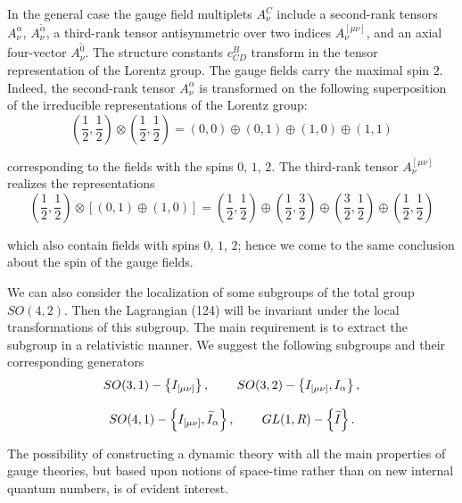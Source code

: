 \documentclass[a4paper,12pt]{article}
\begin{document}
In the general case the gauge field multiplets $A_\nu ^C$ include
a second-rank tensors $A_\nu ^\alpha $, $A_\nu ^{\widetilde{\alpha
}}$, a third-rank tensor antisymmetric over two indices $A_\nu
^{[\mu \nu ]}$, and an axial four-vector $A_\nu ^{\widetilde{0}}$.
The structure constants $ c_{CD}^B$ transform in the tensor
representation of the Lorentz group. The gauge fields carry the
maximal spin $2$. Indeed, the second-rank tensor $ A_\nu ^\alpha $
is transformed on the following superposition of the irreducible
representations of the Lorentz group:
\begin{equation}
\left( \frac 12,\frac 12\right) \otimes \left( \frac 12,\frac
12\right) =\left( 0,0\right) \oplus \left( 0,1\right) \oplus
\left( 1,0\right) \oplus \left( 1,1\right)  \label{130}
\end{equation}

corresponding to the fields with the spins $0$, $1$, $2$. The third-rank
tensor $A_\nu ^{[\mu \nu ]}$ realizes the representations
\begin{equation}
\left( \frac 12,\frac 12\right) \otimes \left[ \left( 0,1\right)
\oplus \left( 1,0\right) \right] =\left( \frac 12,\frac 12\right)
\oplus \left( \frac 12,\frac 32\right) \oplus \left( \frac
32,\frac 12\right) \oplus \left( \frac 12,\frac 12\right)
\label{131}
\end{equation}

which also contain fields with spins $0$, $1$, $2$; hence we come to the
same conclusion about the spin of the gauge fields.

We can also consider the localization of some subgroups of the
total group $ SO(4,2).$ Then the Lagrangian (124) will be
invariant under the local transformations of this subgroup. The
main requirement is to extract the subgroup in a relativistic
manner. We suggest the following subgroups and their corresponding
generators
\[
SO(3,1)-\left\{ I_{[\mu \nu ]}\right\}
,\hspace{0.3in}SO(3,2)-\left\{ I_{[\mu \nu ]},I_\alpha \right\} ,
\]
\vspace{-8mm}
\begin{equation}  \label{132}
\end{equation}
\vspace{-8mm}
\[
SO(4,1)-\left\{ I_{[\mu \nu ]},\widetilde{I}_\alpha \right\} ,
\hspace{0.3in} GL(1,R)-\left\{ \widetilde{I}\right\} .
\]

The possibility of constructing a dynamic theory with all the main
properties of gauge theories, but based upon notions of space-time rather
than on new internal quantum numbers, is of evident interest.
\end{document}
